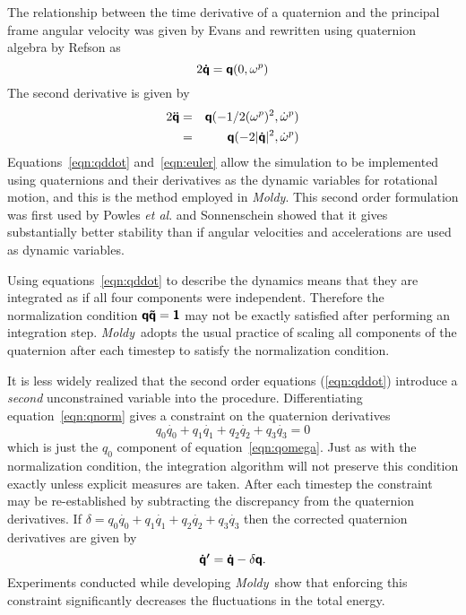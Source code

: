 \documentclass[a4paper,twoside]{report}
\newcommand{\bm}[1]{\mathbf{#1}}
\newcommand{\Quat}[1]{\mbox{\mathversion{bold}$\mathsf{#1}$}}
\newcommand{\moldy}{\emph{Moldy}}
\begin{document}
The relationship between the time derivative of a quaternion and the
principal frame angular velocity was given by Evans\cite[Equation
27]{evans:77} and rewritten using quaternion algebra by 
Refson\cite{refson:87a} as
\begin{equation}
2 \Quat{\dot{q}} = \Quat{q}(0,\bm\omega^p)
\label{eqn:qomega}
\end{equation}
The second derivative is given by
\begin{eqnarray}
\nonumber
2\Quat{\ddot{q}} & = & \Quat{q}(- 1/2 (\omega^p)^2,\dot{\bm\omega}^p) \\
 & = & \Quat{q}(-2 |\Quat{\dot{q}}|^2,\dot{\bm\omega}^p)
\label{eqn:qddot}
\end{eqnarray}
Equations~\ref{eqn:qddot} and~\ref{eqn:euler} allow the simulation to
be implemented using quaternions and their derivatives as the dynamic
variables for rotational motion, and this is the method employed in
\moldy.  This second order formulation was first used by Powles \emph{et
al}.\cite{powles:79} and Sonnenschein showed\cite{sonnenschein:85}
that it gives substantially better stability than if angular
velocities and accelerations are used as dynamic variables.
 
Using equations~\ref{eqn:qddot} to describe the dynamics means that
they are integrated as if all four components were independent.
Therefore the normalization condition $\Quat{q \tilde{q}} = \Quat{1}$
may not be exactly satisfied after performing an integration step.
\moldy\ adopts the usual practice of scaling all components of the
quaternion after each timestep to satisfy the normalization
condition\cite{evans:77b}.

It is less widely realized that the second order equations
(\ref{eqn:qddot}) introduce a \emph{second} unconstrained variable
into the procedure.  Differentiating equation~\ref{eqn:qnorm} gives a
constraint on the quaternion derivatives
\begin{equation}
q_0\dot{q_0} + q_1\dot{q_1} + q_2\dot{q_2} + q_3\dot{q_3} = 0
\label{eqn:qconst} 
\end{equation}
which is just the $q_0$ component of equation~\ref{eqn:qomega}.
Just as with the normalization condition, the integration algorithm
will not preserve this condition exactly unless explicit measures are
taken.  After each timestep the constraint may be re-established by
subtracting the discrepancy from the quaternion derivatives.  If
$\delta = q_0\dot{q_0} + q_1\dot{q_1} + q_2\dot{q_2} + q_3\dot{q_3}$
then the corrected quaternion derivatives are given by
\begin{equation}
\Quat{\dot{q}^\prime } =  \Quat{\dot{q}} - \delta \Quat{q}.
\label{eqn:qconcorr}
\end{equation}
Experiments conducted while developing \moldy\ show that enforcing
this constraint significantly decreases the fluctuations in the total
energy. 
\end{document}
